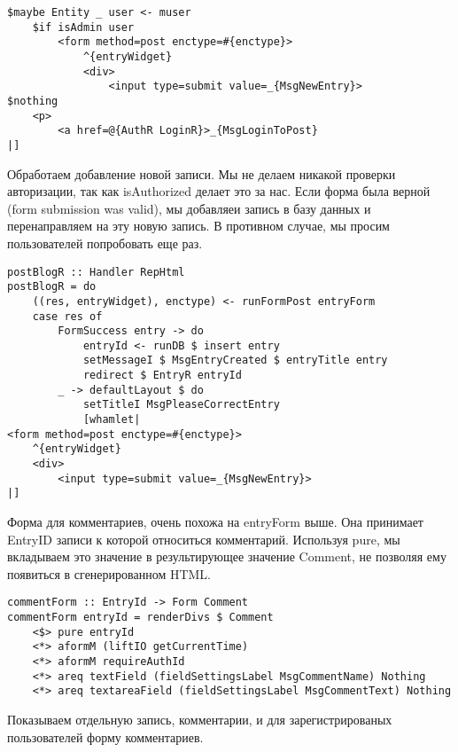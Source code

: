 \begin{lstlisting}
$maybe Entity _ user <- muser
    $if isAdmin user
        <form method=post enctype=#{enctype}>
            ^{entryWidget}
            <div>
                <input type=submit value=_{MsgNewEntry}>
$nothing
    <p>
        <a href=@{AuthR LoginR}>_{MsgLoginToPost}
|]
\end{lstlisting}
 
Обработаем добавление новой записи. Мы не делаем никакой проверки авторизации, так как isAuthorized делает это за нас. Если форма была верной (form submission was valid), мы добавляеи запись в базу данных и перенаправляем на эту новую запись. В противном случае, мы просим пользователей попробовать еще раз. 
 
\begin{lstlisting}
postBlogR :: Handler RepHtml
postBlogR = do
    ((res, entryWidget), enctype) <- runFormPost entryForm
    case res of
        FormSuccess entry -> do
            entryId <- runDB $ insert entry
            setMessageI $ MsgEntryCreated $ entryTitle entry
            redirect $ EntryR entryId
        _ -> defaultLayout $ do
            setTitleI MsgPleaseCorrectEntry
            [whamlet|
<form method=post enctype=#{enctype}>
    ^{entryWidget}
    <div>
        <input type=submit value=_{MsgNewEntry}>
|]
\end{lstlisting}
 
Форма для комментариев, очень похожа на entryForm выше. Она принимает EntryID записи к которой относиться комментарий. Используя pure, мы вкладываем это значение в результирующее значение Comment, не позволяя ему появиться в сгенерированном HTML. 
 
\begin{lstlisting}
commentForm :: EntryId -> Form Comment
commentForm entryId = renderDivs $ Comment
    <$> pure entryId
    <*> aformM (liftIO getCurrentTime)
    <*> aformM requireAuthId
    <*> areq textField (fieldSettingsLabel MsgCommentName) Nothing
    <*> areq textareaField (fieldSettingsLabel MsgCommentText) Nothing
\end{lstlisting}
 
Показываем отдельную запись, комментарии, и для зарегистрированых пользователей форму комментариев.
 
